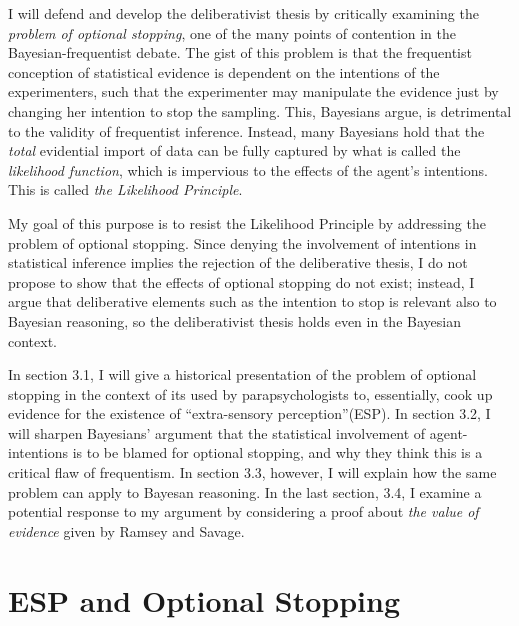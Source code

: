 I will defend and develop the deliberativist thesis by critically
examining the \emph{problem of optional stopping}, one of the many points of
contention in the Bayesian-frequentist debate. The gist of this problem
is that the frequentist conception of statistical evidence is dependent
on the intentions of the experimenters, such that the experimenter may
manipulate the evidence just by changing her intention to stop the
sampling. This, Bayesians argue, is detrimental to the validity of
frequentist inference. Instead, many Bayesians hold that the \emph{total} evidential
import of data can be fully captured by what is called the
\emph{likelihood function}, which is impervious to the effects of the
agent's intentions. This is called \emph{the Likelihood Principle}.

My goal of this purpose is to resist the Likelihood Principle by
addressing the problem of optional stopping. Since denying the involvement of intentions in statistical inference implies the rejection of the deliberative thesis, I do not propose to show that the effects of optional stopping do not exist; instead, I argue that deliberative elements such as the intention to stop is relevant also to Bayesian reasoning, so the deliberativist thesis holds even in the
Bayesian context.

In section 3.1, I will give a historical presentation of the problem of
optional stopping in the context of its used by
parapsychologists to, essentially, cook up evidence for the existence of
``extra-sensory perception''(ESP). In section 3.2, I will sharpen
Bayesians' argument that the statistical involvement of agent-intentions is to be blamed for optional stopping, and why
they think this is a critical flaw of frequentism. In section 3.3,
however, I will explain how the same problem can apply to Bayesan
reasoning. In the last section, 3.4, I examine a potential response to
my argument by considering a proof about \emph{the value of evidence}
given by Ramsey and Savage.

\hypertarget{esp-and-optional-stopping}{%
\section{ESP and Optional Stopping}\label{sec:esp-and-optional-stopping}}

